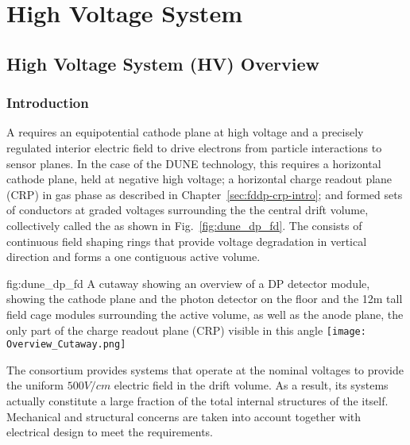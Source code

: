 \chapter{High Voltage System}
\label{ch:fddp-hv}

\section{High Voltage System (HV) Overview}
\label{sec:fddp-hv-ov}


\subsection{Introduction}
\label{sec:fddp-hv-intro}

A  requires an equipotential cathode plane at high voltage and a precisely regulated interior electric field to drive 
electrons from particle interactions to sensor planes.  In the case of the DUNE  technology, 
this requires a horizontal cathode plane, held at negative high voltage; a horizontal charge readout plane (CRP) in gas phase as described in  Chapter~\ref{sec:fddp-crp-intro}; and formed sets of conductors at graded voltages surrounding the
 the central drift volume, collectively called the  as shown in Fig.~\ref{fig:dune_dp_fd}. The  consists of continuous field shaping rings that provide voltage degradation in vertical direction and forms a one contiguous active volume.


\begin{dunefigure}[A DP Overview]{fig:dune_dp_fd}
{A cutaway showing an overview of a DP detector module, showing the cathode plane and the photon detector on the floor and the 12m tall field cage modules surrounding the active volume, as well as the anode plane, the only part of the charge readout plane (CRP) visible in this angle}
\texttt{[image: Overview\_Cutaway.png]}
\end{dunefigure}

The  consortium provides systems that operate at the nominal voltages to provide the uniform $500V/cm$ electric field in the  drift volume. As a result, its systems actually constitute a large fraction of the total internal structures of the  itself. Mechanical and structural concerns are taken into account together with electrical design to meet the requirements. 

